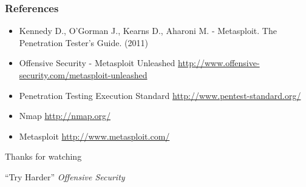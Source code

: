 \documentclass{beamer}
\begin{document}
\begin{frame}
	\frametitle{References}
	\begin{itemize} \itemsep3ex
	\item Kennedy D., O’Gorman J., Kearns D., Aharoni M. - Metasploit. The Penetration Tester’s Guide. (2011)
	\item Offensive Security - Metasploit Unleashed \url{http://www.offensive-security.com/metasploit-unleashed}
	\item Penetration Testing Execution Standard \url{http://www.pentest-standard.org/}
	\item Nmap \url{http://nmap.org/}
	\item Metasploit \url{http://www.metasploit.com/}
	\end{itemize}
\end{frame}

\begin{frame}
\begin{center}
	\Huge Thanks for watching
	\begin{exampleblock}{}
		\begin{center}
		{\fontsize{18}{2}\selectfont ``Try Harder''} {\fontsize{11}{2}\selectfont \emph{Offensive Security}}
		\end{center}
	\end{exampleblock}
\end{center}
\end{frame}
\end{document}
